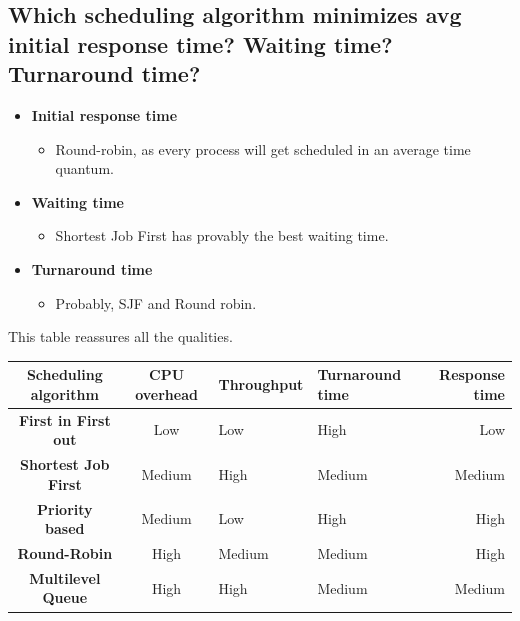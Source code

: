 \documentclass[a4paper]{article}
\begin{document}
\subsection{Which scheduling algorithm minimizes avg initial response time? Waiting time? Turnaround time?} %
\label{sub:Which scheduling algorithm minimizes avg intitial response time? Waiting time? Turnaround time?}
\begin{itemize}
  \item {\bf Initial response time}
    \begin{itemize}
      \item Round-robin, as every process will get scheduled in an average time quantum.
    \end{itemize}
  \item {\bf Waiting time}
    \begin{itemize}
      \item Shortest Job First has provably the best waiting time.
    \end{itemize}
  \item {\bf Turnaround time}
    \begin{itemize}
      \item Probably, SJF and Round robin.
    \end{itemize}
\end{itemize}
This table reassures all the qualities. \\
\begin{tabular}{| c | c | l | l | r |}
  \hline
  {\bf Scheduling algorithm} & {\bf CPU overhead} & {\bf Throughput} & {\bf Turnaround time} & {\bf Response time} \\
  \hline
  {\bf First in First out} & Low            & Low              & High                  & Low \\
  \hline
  {\bf Shortest Job First} & Medium            & High              & Medium                  & Medium \\
  \hline
  \hline
  {\bf Priority based} & Medium            & Low              & High                  & High \\
  \hline
  {\bf Round-Robin} & High            & Medium              & Medium                  & High \\
  \hline
  {\bf Multilevel Queue} & High            & High              & Medium                  & Medium \\
  \hline
\end{tabular}
\end{document}
